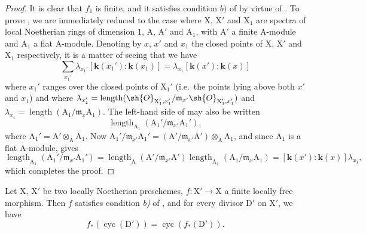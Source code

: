 \begin{proof}
It is clear that $f_1$ is finite, and it satisfies condition $b)$ of  by virtue of .
To prove , we are immediately reduced to the case where $\mathrm{X}$, $\mathrm{X}'$ and $\mathrm{X}_1$ are spectra of local Noetherian rings of dimension $1$, $\mathrm{A}$, $\mathrm{A}'$ and $\mathrm{A}_1$, with $\mathrm{A}'$ a finite A-module and $\mathrm{A}_1$ a flat A-module.
Denoting by $x$, $x'$ and $x_1$ the closed points of $\mathrm{X}$, $\mathrm{X}'$ and $\mathrm{X}_1$ respectively, it is a matter of seeing that we have
\[
\label{IV.21.10.16.2}
  \sum_{x_1'}\lambda_{x_1'}[\boldsymbol{k}(x_1'):\boldsymbol{k}(x_1)]=\lambda_{x_1}[\boldsymbol{k}(x'):\boldsymbol{k}(x)]
  \tag{21.10.16.2}
\]
where $x_1'$ ranges over the closed points of $\mathrm{X}_1'$ (i.e.\ the points lying above both $x'$ and $x_1$) and where $\lambda_{x_1'}=\operatorname{length}(\sh{O}_{\mathrm{X}_1',x_1'}/\mathfrak{m}_{x'}\sh{O}_{\mathrm{X}_1',x_1'})$ and $\lambda_{x_1}=\operatorname{length}(\mathrm{A}_1/\mathfrak{m}_x\mathrm{A}_1)$.
The left-hand side of  may also be written
\[
  \operatorname{length}_{\mathrm{A}_1}(\mathrm{A}_1'/\mathfrak{m}_{x'}\mathrm{A}_1'),
\]
where $\mathrm{A}_1'=\mathrm{A}'\otimes_{\mathrm{A}}\mathrm{A}_1$.
Now $\mathrm{A}_1'/\mathfrak{m}_{x'}\mathrm{A}_1'=(\mathrm{A}'/\mathfrak{m}_{x'}\mathrm{A}')\otimes_{\mathrm{A}}\mathrm{A}_1$, and since $\mathrm{A}_1$ is a flat A-module,  gives
\[
  \operatorname{length}_{\mathrm{A}_1}(\mathrm{A}_1'/\mathfrak{m}_{x'}\mathrm{A}_1')
  =\operatorname{length}_{\mathrm{A}}(\mathrm{A}'/\mathfrak{m}_{x'}\mathrm{A}')
   \operatorname{length}_{\mathrm{A}_1}(\mathrm{A}_1/\mathfrak{m}_x\mathrm{A}_1)
  =[\boldsymbol{k}(x'):\boldsymbol{k}(x)]\lambda_{x_1},
\]
which completes the proof.
\end{proof}

\begin{proposition}[21.10.17]
\label{IV.21.10.17}
Let $\mathrm{X}$, $\mathrm{X}'$ be two locally Noetherian preschemes, $f:\mathrm{X}'\to\mathrm{X}$ a finite locally free morphism.
Then $f$ satisfies condition \emph{b)} of , and for every divisor $\mathrm{D}'$ on $\mathrm{X}'$, we have
\[
\label{IV.21.10.17.1}
  f_*(\operatorname{cyc}(\mathrm{D}'))=\operatorname{cyc}(f_*(\mathrm{D}')).
  \tag{21.10.17.1}
\]
\end{proposition}

